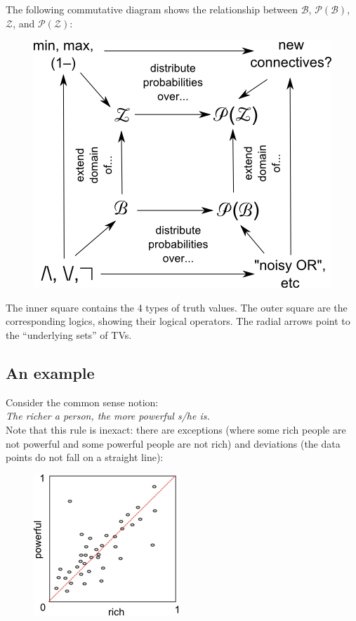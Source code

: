 The following commutative diagram shows the relationship between $\mathcal{B}$, $\mathcal{P(B)}$, $\mathcal{Z}$, and $\mathcal{P(Z)}$:

\begin{figure}[H]
\centering
\includegraphics[scale=0.8]{P(Z)-commutative-diagram.png}
\end{figure}

The inner square contains the 4 types of truth values.  The outer square are the corresponding logics, showing their logical operators.  The radial arrows point to the ``underlying sets'' of TVs.

\subsection{An example}

Consider the common sense notion:\\
\hspace*{1cm} \textit{The richer a person, the more powerful s/he is.}\\
Note that this rule is inexact:  there are exceptions (where some rich people are not powerful and some powerful people are not rich) and deviations (the data points do not fall on a straight line):

\begin{figure}[H]
\centering
\includegraphics{rich-vs-powerful.png}
\end{figure}

